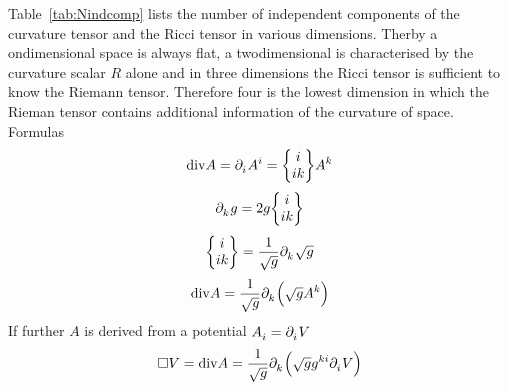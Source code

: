 Table~\ref{tab:Nindcomp} lists the number of independent components of the
curvature tensor and the Ricci tensor in various dimensions. Therby a
ondimensional space is always flat, a twodimensional is characterised by the
curvature scalar $R$ alone and in three dimensions the Ricci tensor is
sufficient to know the Riemann tensor. Therefore four is the lowest dimension in
which the Rieman tensor contains additional information of the curvature of
space.
Formulas 
\begin{equation}
\mathrm{div} A=\tensor{\partial}{_i}\tensor{A}{^i}=\cSym{i}{i}{k}\tensor{A}{^k}
\end{equation}
\begin{equation}
\tensor{\partial}{_k}g=2g\cSym{i}{i}{k}
\end{equation}
\begin{equation}
\cSym{i}{i}{k}=\frac{1}{\sqrt{g}}\tensor{\partial}{_k}\sqrt{g}
\end{equation}
\begin{equation}
\mathrm{div}
A=\frac{1}{\sqrt{g}}\tensor{\partial}{_k}\left(\sqrt{g}\tensor{A}{^k}\right)
\end{equation}
If further $A$ is derived from a potential
$\tensor{A}{_i}=\tensor{\partial}{_i}V$
\begin{equation}
\square V
=\mathrm{div}A
=\frac{1}{\sqrt{g}}\tensor{\partial}{_k}\left(\sqrt{g}\tensor{g}{^k^i}\tensor{\partial}{_i}V\right)\label{eq:quabla}
\end{equation}
